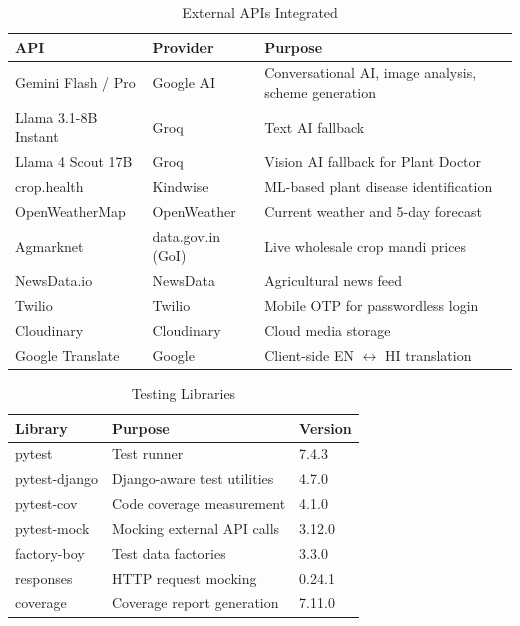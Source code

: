 \documentclass[12pt,a4paper]{article}
\begin{document}
\begin{table}[h]
\caption{External APIs Integrated}
\centering
\begin{tabular}{|l|l|p{5cm}|}
\hline
\textbf{API} & \textbf{Provider} & \textbf{Purpose} \\ \hline
Gemini Flash / Pro & Google AI & Conversational AI, image analysis, scheme generation \\ \hline
Llama 3.1-8B Instant & Groq & Text AI fallback \\ \hline
Llama 4 Scout 17B & Groq & Vision AI fallback for Plant Doctor \\ \hline
crop.health & Kindwise & ML-based plant disease identification \\ \hline
OpenWeatherMap & OpenWeather & Current weather and 5-day forecast \\ \hline
Agmarknet & data.gov.in (GoI) & Live wholesale crop mandi prices \\ \hline
NewsData.io & NewsData & Agricultural news feed \\ \hline
Twilio & Twilio & Mobile OTP for passwordless login \\ \hline
Cloudinary & Cloudinary & Cloud media storage \\ \hline
Google Translate & Google & Client-side EN $\leftrightarrow$ HI translation \\ \hline
\end{tabular}
\end{table}

\begin{table}[h]
\caption{Testing Libraries}
\centering
\begin{tabular}{|l|p{5.5cm}|l|}
\hline
\textbf{Library} & \textbf{Purpose} & \textbf{Version} \\ \hline
pytest & Test runner & 7.4.3 \\ \hline
pytest-django & Django-aware test utilities & 4.7.0 \\ \hline
pytest-cov & Code coverage measurement & 4.1.0 \\ \hline
pytest-mock & Mocking external API calls & 3.12.0 \\ \hline
factory-boy & Test data factories & 3.3.0 \\ \hline
responses & HTTP request mocking & 0.24.1 \\ \hline
coverage & Coverage report generation & 7.11.0 \\ \hline
\end{tabular}
\end{table}
\end{document}

